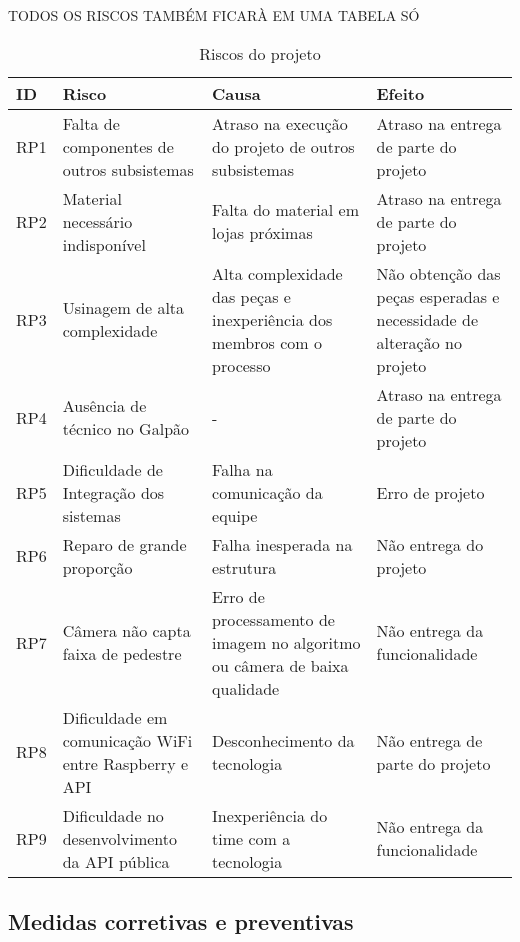 TODOS OS RISCOS TAMBÉM FICARÀ EM UMA TABELA SÓ

\begin{table}[ht]
    \centering
    \caption{Riscos do projeto}
    \begin{tabular}{p{0.5in}p{1.5in}p{1.5in}p{1.5in}}
    ID & Risco & Causa & Efeito\\ \hline
    RP1 & Falta de componentes de outros subsistemas & Atraso na execução do projeto de outros subsistemas & Atraso na entrega de parte do projeto \\ \hline
    RP2 & Material necessário indisponível & Falta do material em lojas próximas & Atraso na entrega de parte do projeto \\ \hline
    RP3 & Usinagem de alta complexidade & Alta complexidade das peças e inexperiência dos membros com o processo & Não obtenção das peças esperadas e necessidade de alteração no projeto \\ \hline
    RP4 & Ausência de técnico no Galpão & - & Atraso na entrega de parte do projeto \\ \hline
    RP5 & Dificuldade de Integração dos sistemas & Falha na comunicação da equipe & Erro de projeto \\ \hline
    RP6 & Reparo de grande proporção & Falha inesperada na estrutura & Não entrega do projeto \\ \hline
    RP7 & Câmera não capta faixa de pedestre & Erro de processamento de imagem no algoritmo ou câmera de baixa qualidade & Não entrega da funcionalidade \\ \hline
    RP8 & Dificuldade em comunicação WiFi entre Raspberry e API & Desconhecimento da tecnologia & Não entrega de parte do projeto \\ \hline
    RP9 & Dificuldade no desenvolvimento da API pública & Inexperiência do time com a tecnologia & Não entrega da funcionalidade \\ \hline
    \end{tabular}
\end{table}

\subsection{Medidas corretivas e preventivas}

